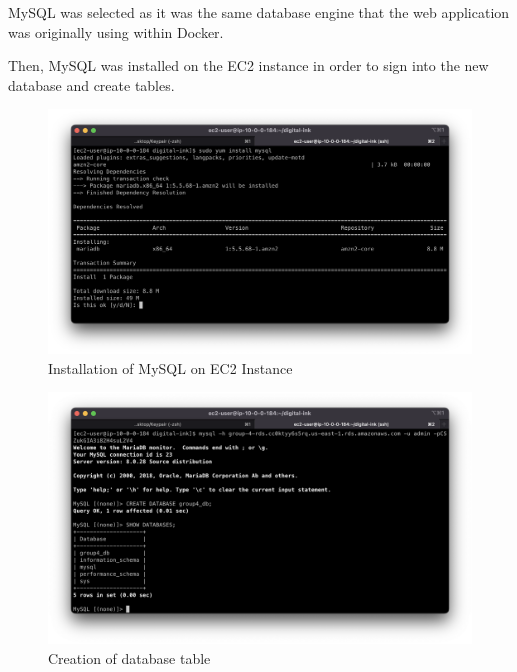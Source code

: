 MySQL was selected as it was the same database engine that the web application was originally using within Docker.

Then, MySQL was installed on the EC2 instance in order to sign into the new database and create tables.

\begin{figure}[!htbp]
\centering
\includegraphics[width=\textwidth]{resources/rds/rds-mysql-install.png}
\caption{Installation of MySQL on EC2 Instance}
\label{fig:rds-msql-install}
\end{figure}

\begin{figure}[!htbp]
\centering
\includegraphics[width=\textwidth]{resources/rds/rds-database-creation.png}
\caption{Creation of database table}
\label{fig:rds-db-create-2}
\end{figure}

